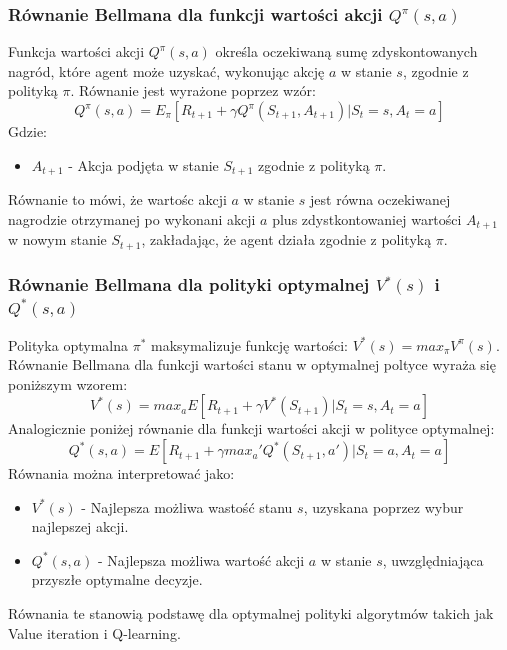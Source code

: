 \documentclass[a4paper, 12pt]{article}
\begin{document}
    \subsubsection{Równanie Bellmana dla funkcji wartości akcji \( Q^\pi(s,a) \)}
    Funkcja wartości akcji \( Q^\pi(s,a) \) określa oczekiwaną sumę zdyskontowanych nagród, które agent może uzyskać, wykonując akcję \( a \) w stanie \( s \), zgodnie z polityką \( \pi \).
    Równanie jest wyrażone poprzez wzór:
    \[ Q^\pi(s,a) = E_\pi[R_{t+1} + \gamma Q^\pi(S_{t+1}, A_{t+1})|S_t = s, A_t = a] \]
    Gdzie:
    \begin{itemize}
        \item \( A_{t+1} \) - Akcja podjęta w stanie \( S_{t+1} \) zgodnie z polityką \( \pi \).
    \end{itemize}
    Równanie to mówi, że wartośc akcji \( a \) w stanie \( s \) jest równa oczekiwanej nagrodzie otrzymanej po wykonani akcji \( a \) plus zdystkontowaniej wartości
    \( A_{t+1} \) w nowym stanie \( S_{t+1} \), zakładając, że agent działa zgodnie z polityką \( \pi \).
    \subsubsection{Równanie Bellmana dla polityki optymalnej \( V^*(s) \) i \( Q^*(s,a) \)}
    Polityka optymalna \( \pi^* \) maksymalizuje funkcję wartości: \( V^*(s) = max_\pi V^\pi(s) \).
    Równanie Bellmana dla funkcji wartości stanu w optymalnej poltyce wyraża się poniższym wzorem:
    \[ V^*(s) = max_a E[R_{t+1} + \gamma V^*(S_{t+1})|S_t = s, A_t = a] \]
    Analogicznie poniżej równanie dla funkcji wartości akcji w polityce optymalnej:
    \[ Q^*(s,a) = E[R_{t+1} + \gamma max_a' Q^*(S_{t+1},a')|S_t = a, A_t = a] \]
    Równania można interpretować jako:
    \begin{itemize}
        \item \( V^*(s) \) - Najlepsza możliwa wastość stanu \( s \), uzyskana poprzez wybur najlepszej akcji.
        \item \( Q^*(s,a) \) - Najlepsza możliwa wartość akcji \( a \) w stanie \( s \), uwzględniająca przyszłe optymalne decyzje.
    \end{itemize}
    Równania te stanowią podstawę dla optymalnej polityki algorytmów takich jak Value iteration i Q-learning.
\end{document}
